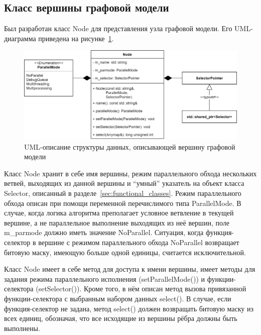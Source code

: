 \subsection{Класс вершины графовой модели}
Был разработан класс \textsf{Node} для представления узла графовой модели. Его UML-диаграмма приведена на рисунке~\ref{fig:UMLNode}.
\begin{figure}[!ht]
    \centering
    \includegraphics[height=0.25\textheight]{figures/class.node_v2.png}
    \caption{UML-описание структуры данных, описывающей вершину графовой модели}
    \label{fig:UMLNode}
\end{figure}

Класс \textsf{Node} хранит в себе имя вершины, режим параллельного обхода нескольких ветвей, выходящих из данной вершины и ``умный'' указатель на объект класса \textsf{Selector}, описанный в разделе~\ref{sec:functional_classes}. Режим параллельного обхода описан при помощи переменной перечислимого типа \textsf{ParallelMode}. В случае, когда логика алгоритма преполагает условное ветвление в текущей вершине, а не параллельное выполнение выходящих из неё вершин, поле \textsf{m_parmode} должно иметь значение \textsf{NoParallel}. Ситуация, когда функция-селектор в вершине с режимом параллельного обхода \textsf{NoParallel} возвращает битовую маску, имеющую больше одной единицы, считается исключительной.

Класс \textsf{Node} имеет в себе метод для доступа к имени вершины, имеет методы для задания режима параллельного исполнения (\textsf{setParallelMode()}) и функции-селектора (\textsf{setSelector()}). Кроме того, в нём описан метод вызова привязанной функции-селектора с выбранным набором данных \textsf{select()}. В случае, если функция-селектор не задана, метод \textsf{select()} должен возвращать битовую маску из всех единиц, обозначая, что все исходящие из вершины рёбра должны быть выполнены.

